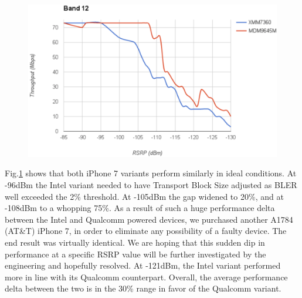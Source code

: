 \documentclass[conference]{IEEEtran}
\begin{document}
\begin{figure}[!ht]
	\centering
	\begin{center}
		\includegraphics*[width=0.8\linewidth]{band12}
		\caption{}
		\label{fig:band12}
	\end{center}
\end{figure}

Fig.\ref{fig:band12} shows that both iPhone 7 variants perform similarly in ideal conditions. At -96dBm the Intel variant needed to have Transport Block Size adjusted as BLER well exceeded the 2\% threshold. At -105dBm the gap widened to 20\%, and at -108dBm to a whopping 75\%. As a result of such a huge performance delta between the Intel and Qualcomm powered devices, we purchased another A1784 (AT\&T) iPhone 7, in order to eliminate any possibility of a faulty device. The end result was virtually identical. We are hoping that this sudden dip in performance at a specific RSRP value will be further investigated by the engineering and hopefully resolved. At -121dBm, the Intel variant performed more in line with its Qualcomm counterpart. Overall, the average performance delta between the two is in the 30\% range in favor of the Qualcomm variant. 
\end{document}
